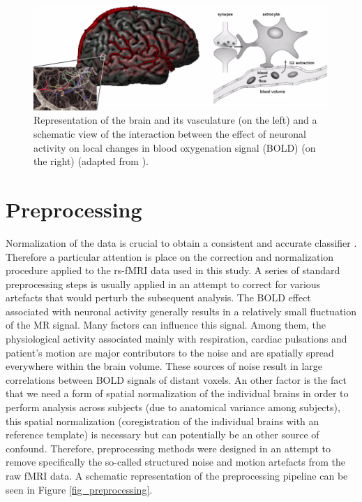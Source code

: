 \begin{figure}[H]
\begin{center}
\includegraphics[width=\linewidth]{../figures/bold.png}
\end{center}
\caption[Schematic of the BOLD effect]
{Representation of the brain and its vasculature (on the left) and a schematic view of the interaction between the effect of neuronal activity on local changes in blood oxygenation signal (BOLD) (on the right) (adapted from \cite{Heeger2002}).}
\label{fig_bold}
\end{figure}

\section{Preprocessing}Normalization of the data is crucial to obtain a consistent and accurate classifier \citep{Kotsiantis2007}. Therefore a particular attention is place on the correction and normalization procedure applied to the rs-fMRI data used in this study. A series of standard preprocessing steps is usually applied in an attempt to correct for various artefacts that would perturb the subsequent analysis. The BOLD effect associated with neuronal activity generally results in a relatively small fluctuation of the MR signal. Many factors can influence this signal. Among them,  the physiological activity associated mainly with respiration, cardiac pulsations and patient's motion are major contributors to the noise and are spatially spread everywhere within the brain volume. These sources of noise result in large correlations between BOLD signals of distant voxels. An other factor is the fact that we need a form of spatial normalization of the individual brains in order to perform analysis across 
subjects (due to anatomical variance among subjects), this spatial normalization (coregistration of the individual brains with an reference template) is necessary but can potentially be an other source of confound. 
Therefore, preprocessing methods were designed in an attempt to remove specifically the so-called structured noise and motion artefacts from the raw fMRI data. A schematic representation of the preprocessing pipeline can be seen in Figure \ref{fig_preprocessing}.

